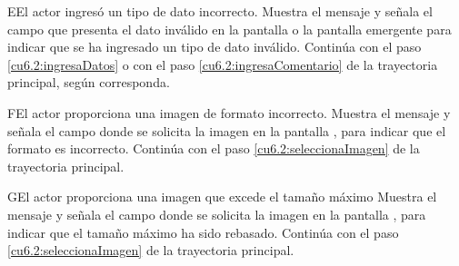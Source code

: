  \begin{UCtrayectoriaA}{E}{El actor ingresó un tipo de dato incorrecto.}
    \UCpaso[\UCsist] Muestra el mensaje  y señala el campo que presenta el dato inválido en la 
    pantalla  o la pantalla emergente  para indicar que se ha ingresado un tipo de dato inválido.
    \UCpaso[] Continúa con el paso \ref{cu6.2:ingresaDatos} o con el paso \ref{cu6.2:ingresaComentario} de la trayectoria principal, según corresponda.
 \end{UCtrayectoriaA}

 \begin{UCtrayectoriaA}{F}{El actor proporciona una imagen de formato incorrecto.}
    \UCpaso[\UCsist] Muestra el mensaje  y señala el campo donde se solicita la imagen
    en la pantalla , para indicar que el formato es incorrecto.
    \UCpaso[] Continúa con el paso \ref{cu6.2:seleccionaImagen} de la trayectoria principal.
 \end{UCtrayectoriaA}
 
 \begin{UCtrayectoriaA}{G}{El actor proporciona una imagen que excede el tamaño máximo}
    \UCpaso[\UCsist] Muestra el mensaje  y señala el campo donde se solicita la imagen
    en la pantalla , para indicar que el tamaño máximo ha sido rebasado.
    \UCpaso[] Continúa con el paso \ref{cu6.2:seleccionaImagen} de la trayectoria principal.
 \end{UCtrayectoriaA}
 
